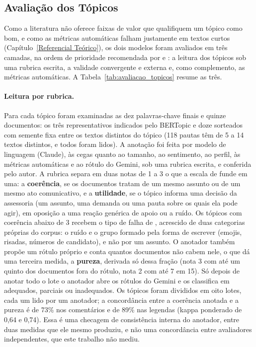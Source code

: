 \subsection{Avaliação dos Tópicos}\label{sec:avaliacao-topicos}

Como a literatura não oferece faixas de valor que qualifiquem um tópico como bom, e como as métricas automáticas falham justamente em textos curtos (Capítulo~\ref{Referencial Teórico}), os dois modelos foram avaliados em três camadas, na ordem de prioridade recomendada por  e : a leitura dos tópicos sob uma rubrica escrita, a validade convergente e externa e, como complemento, as métricas automáticas. A Tabela~\ref{tab:avaliacao_topicos} resume as três.

\paragraph*{Leitura por rubrica.} Para cada tópico foram examinadas as dez palavras-chave finais e quinze documentos: os três representativos indicados pelo BERTopic e doze sorteados com semente fixa entre os textos distintos do tópico (118 pautas têm de 5 a 14 textos distintos, e todos foram lidos). A anotação foi feita por modelo de linguagem (Claude), às cegas quanto ao tamanho, ao sentimento, ao perfil, às métricas automáticas e ao rótulo do Gemini, sob uma rubrica escrita, e conferida pelo autor. A rubrica separa em duas notas de 1 a 3 o que a escala de  funde em uma: a \textbf{coerência}, se os documentos tratam de um mesmo assunto ou de um mesmo ato comunicativo, e a \textbf{utilidade}, se o tópico informa uma decisão da assessoria (um assunto, uma demanda ou uma pauta sobre os quais ela pode agir), em oposição a uma reação genérica de apoio ou a ruído. Os tópicos com coerência abaixo de 3 recebem o tipo de falha de , acrescido de duas categorias próprias do corpus: o ruído e o grupo formado pela forma de escrever (emojis, risadas, números de candidato), e não por um assunto. O anotador também propõe um rótulo próprio e conta quantos documentos não cabem nele, o que dá uma terceira medida, a \textbf{pureza}, derivada só dessa fração (nota 3 com até um quinto dos documentos fora do rótulo, nota 2 com até 7 em 15). Só depois de anotar todo o lote o anotador abre os rótulos do Gemini e os classifica em adequados, parciais ou inadequados. Os tópicos foram divididos em oito lotes, cada um lido por um anotador; a concordância entre a coerência anotada e a pureza é de 73\% nos comentários e de 89\% nas legendas (kappa ponderado de 0,64 e 0,74). Essa é uma checagem de consistência interna do anotador, entre duas medidas que ele mesmo produziu, e não uma concordância entre avaliadores independentes, que este trabalho não mediu.

